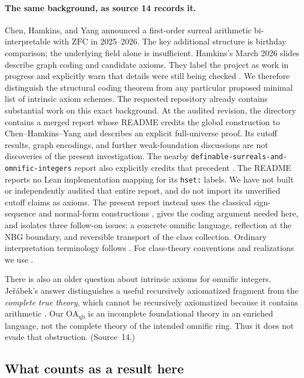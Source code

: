 \documentclass[11pt,letterpaper]{article}
\theoremstyle{definition}
\theoremstyle{remark}
\newcommand{\ZFC}{\mathrm{ZFC}}
\newcommand{\repo}[1]{\nolinkurl{#1}}
\newcommand{\OAqb}{\mathrm{OA}_{\mathrm{qb}}}
\begin{document}
\paragraph{The same background, as source 14 records it.} Chen, Hamkins, and
Yang announced a first-order surreal arithmetic bi-interpretable with $\ZFC$ in
2025--2026. The key additional structure is birthday comparison; the underlying
field alone is insufficient. Hamkins's March 2026 slides describe graph coding
and candidate axioms. They label the project as work in progress and explicitly
warn that details were still being checked \cite{CHYNotreDame,CHYCUNY}. We
therefore distinguish the structural coding theorem from any particular proposed
minimal list of intrinsic axiom schemes. The requested repository already
contains substantial work on this exact background. At the audited revision, the
directory
contains a merged report whose README credits the global construction to
Chen--Hamkins--Yang and describes an explicit full-universe proof. Its cutoff
results, graph encodings, and further weak-foundation discussions are not
discoveries of the present investigation. The nearby
\repo{definable-surreals-and-omnific-integers} report also explicitly credits
that precedent \cite{ProveItSF14}. The README reports no Lean
implementation mapping for its \texttt{hset:} labels. We have not built or
independently audited that entire report, and do not import its unverified cutoff
claims as axioms. The present report instead uses the classical sign-sequence and
normal-form constructions \cite{Conway,Gonshor}, gives the coding argument needed
here, and isolates three follow-on issues: a concrete omnific language,
reflection at the NBG boundary, and reversible transport of the class
collection. Ordinary interpretation terminology follows \cite{FriedmanVisser}.
For class-theory conventions and realizations we use \cite{WilliamsDiss}.

There is also an older question about intrinsic axioms for omnific integers.
Je\v{r}\'abek's answer distinguishes a useful recursively axiomatized fragment
from the \emph{complete true theory}, which cannot be recursively axiomatized
because it contains arithmetic \cite{JerabekOz}. Our $\OAqb$ is an incomplete
foundational theory in an enriched language, not the complete theory of the
intended omnific ring. Thus it does not evade that obstruction. (Source~14.)

\subsection{What counts as a result here}
\end{document}

